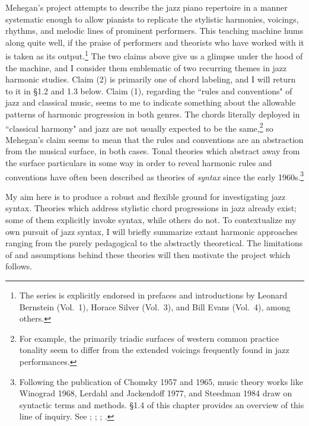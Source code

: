 Mehegan's project attempts to describe the jazz piano repertoire in a manner systematic enough to allow pianists to replicate the stylistic harmonies, voicings, rhythms, and melodic lines of prominent performers.  This teaching machine hums along quite well, if the praise of performers and theorists who have worked with it is taken as its output.\footnote{The series is explicitly endorsed in prefaces and introductions by Leonard Bernstein (Vol.\ 1), Horace Silver (Vol.\ 3), and Bill Evans (Vol.\ 4), among others.}  The two claims above give us a glimpse under the hood of the machine, and I consider them emblematic of two recurring themes in jazz harmonic studies.  Claim (2) is primarily one of chord labeling, and I will return to it in \S 1.2 and 1.3 below.  Claim (1), regarding the ``rules and conventions" of jazz and classical music, seems to me to indicate something about the allowable patterns of harmonic progression in both genres.  The chords literally deployed in ``classical harmony" and jazz are not usually expected to be the same,\footnote{For example, the primarily triadic surfaces of western common practice tonality seem to differ from the extended voicings frequently found in jazz performances.} so Mehegan's claim seems to mean that the rules and conventions are an abstraction from the musical surface, in both cases.  Tonal theories which abstract away from the surface particulars in some way in order to reveal harmonic rules and conventions have often been described as theories of \emph{syntax} since the early 1960s.\footnote{Following the publication of Chomsky 1957 and 1965, music theory works like Winograd 1968, Lerdahl and Jackendoff 1977, and Steedman 1984 draw on syntactic terms and methods.  \S 1.4 of this chapter provides an overview of this line of inquiry.  See \cite{chomsky1957}; \cite{winograd1968}; \cite{lj1977}; \cite{steedman1984}.}

My aim here is to produce a robust and flexible ground for investigating jazz syntax.  Theories which address stylistic chord progressions in jazz already exist; some of them explicitly invoke syntax, while others do not.  To contextualize my own pursuit of jazz syntax, I will briefly summarize extant harmonic approaches ranging from the purely pedagogical to the abstractly theoretical.  The limitations of and assumptions behind these theories will then motivate the project which follows.

